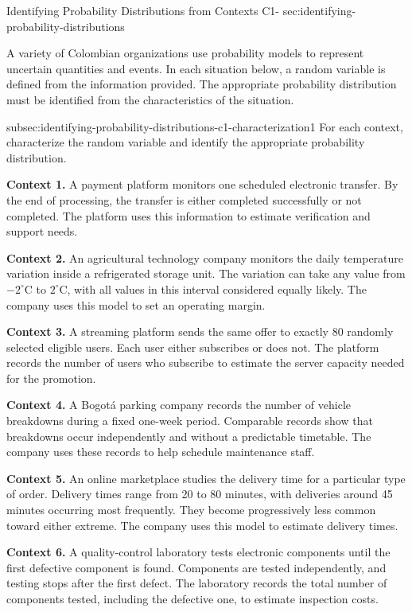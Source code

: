 	
	\sectionScored
	{Identifying Probability Distributions from Contexts}
	{C1-}
	{sec:identifying-probability-distributions}
	{
		A variety of Colombian organizations use probability models to represent
		uncertain quantities and events. In each situation below, a random
		variable is defined from the information provided. The appropriate
		probability distribution must be identified from the characteristics
		of the situation.
		
		\begin{enumerate}
			\CriterionTask
			{subsec:identifying-probability-distributions-c1-characterization}{1}
			{For each context, characterize the random variable and identify the appropriate probability distribution. }
		\end{enumerate}
		
		\textbf{Context 1.} A payment platform monitors one scheduled
		electronic transfer. By the end of processing, the transfer is either
		completed successfully or not completed. The platform uses this information
		to estimate verification and support needs.
		
		\textbf{Context 2.} An agricultural technology company monitors the
		daily temperature variation inside a refrigerated storage unit. The
		variation can take any value from \(-2^\circ\mathrm{C}\) to
		\(2^\circ\mathrm{C}\), with all values in this interval considered
		equally likely. The company uses this model to set an operating margin.
		
		\textbf{Context 3.} A streaming platform sends the same offer to
		exactly 80 randomly selected eligible users. Each user either subscribes
		or does not. The platform records the number of users who subscribe to
		estimate the server capacity needed for the promotion.
		
		\textbf{Context 4.} A Bogotá parking company records the number of
		vehicle breakdowns during a fixed one-week period. Comparable records
		show that breakdowns occur independently and without a predictable
		timetable. The company uses these records to help schedule maintenance
		staff.
		
		\textbf{Context 5.} An online marketplace studies the delivery time
		for a particular type of order. Delivery times range from 20 to
		80 minutes, with deliveries around 45 minutes occurring most frequently.
		They become progressively less common toward either extreme. The
		company uses this model to estimate delivery times.
		
		\textbf{Context 6.} A quality-control laboratory tests electronic
		components until the first defective component is found. Components
		are tested independently, and testing stops after the first defect.
		The laboratory records the total number of components tested, including
		the defective one, to estimate inspection costs.
		
}
